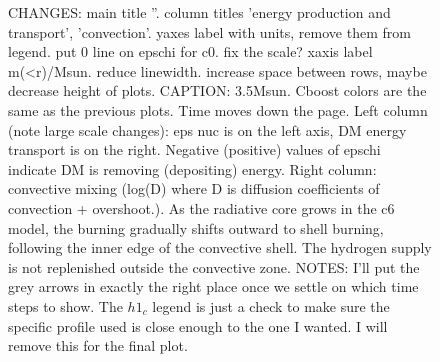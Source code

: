 \documentclass[useAMS,usenatbib]{mnras}
\begin{document}
\begin{figure}
    \caption{
    CHANGES: main title ''. column titles 'energy production and transport', 'convection'. yaxes label with units, remove them from legend. put 0 line on epschi for c0. fix the scale? xaxis label m(<r)/Msun. reduce linewidth. increase space between rows, maybe decrease height of plots.
    CAPTION: 3.5Msun. Cboost colors are the same as the previous plots. Time moves down the page. Left column (note large scale changes): eps nuc is on the left axis, DM energy transport is on the right. Negative (positive) values of epschi indicate DM is removing (depositing) energy. Right column: convective mixing (log(D) where D is diffusion coefficients of convection + overshoot.). As the radiative core grows in the c6 model, the burning gradually shifts outward to shell burning, following the inner edge of the convective shell. The hydrogen supply is not replenished outside the convective zone. NOTES: I'll put the grey arrows in exactly the right place once we settle on which time steps to show. The $h1_c$ legend is just a check to make sure the specific profile used is close enough to the one I wanted. I will remove this for the final plot.}
    \label{fig:m3p5}
  \end{figure}
\end{document}
